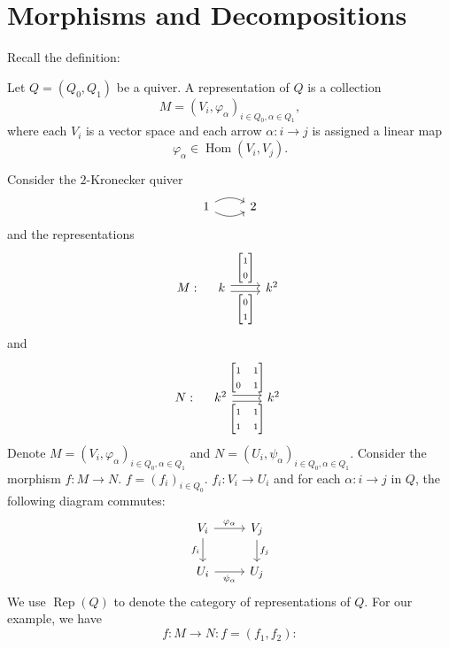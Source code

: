 \documentclass[11pt, a4paper]{report}
\begin{document}
\section{Morphisms and Decompositions}

Recall the definition:

\begin{definition}
Let $Q=(Q_0,Q_1)$ be a quiver. A representation of $Q$ is a collection
\[
M=(V_i,\varphi_\alpha)_{i \in Q_0,\alpha \in Q_1},
\]
where each $V_i$ is a vector space and each arrow $\alpha:i \to j$ is assigned a linear map
\[
\varphi_\alpha \in \operatorname{Hom}(V_i,V_j).
\]
\end{definition}

\begin{example}
Consider the $2$-Kronecker quiver
\[
\begin{tikzcd}
1 \arrow[r, bend left] \arrow[r, bend right] & 2
\end{tikzcd}
\]
and the representations
\[
M:\quad
\begin{tikzcd}
    k \arrow[r, "\begin{bmatrix}1\\0\end{bmatrix}", shift left] \arrow[r, "\begin{bmatrix}0\\1\end{bmatrix}"', shift right] & k^2
\end{tikzcd}
\]
and
\[
N:\quad
\begin{tikzcd}[ampersand replacement=\&]
    k^2 \arrow[r, "{\begin{bmatrix}1 & 1\\0 & 1\end{bmatrix}}", shift left] \arrow[r, "{\begin{bmatrix}1 & 1\\1 & 1\end{bmatrix}}"', shift right] \& k^2
\end{tikzcd}
\]
Denote $M=(V_i, \varphi_\alpha)_{i \in Q_0, \alpha \in Q_1}$ and $N=(U_i, \psi_\alpha)_{i \in Q_0, \alpha \in Q_1}$. Consider the morphism $f:M \to N$. $f=(f_i)_{i \in Q_0}$. $f_i:V_i \to U_i$ and for each $\alpha: i \to j$ in $Q$, the following diagram commutes:
\[
\begin{tikzcd}
    V_i \arrow[r, "\varphi_\alpha"] \arrow[d, "f_i"'] & V_j \arrow[d, "f_j"] \\
    U_i \arrow[r, "\psi_\alpha"'] & U_j
\end{tikzcd}
\]
We use $\operatorname{Rep}(Q)$ to denote the category of representations of $Q$. For our example, we have
\[
f:M \to N: f=(f_1,f_2):
\]


\end{example}
\end{document}
